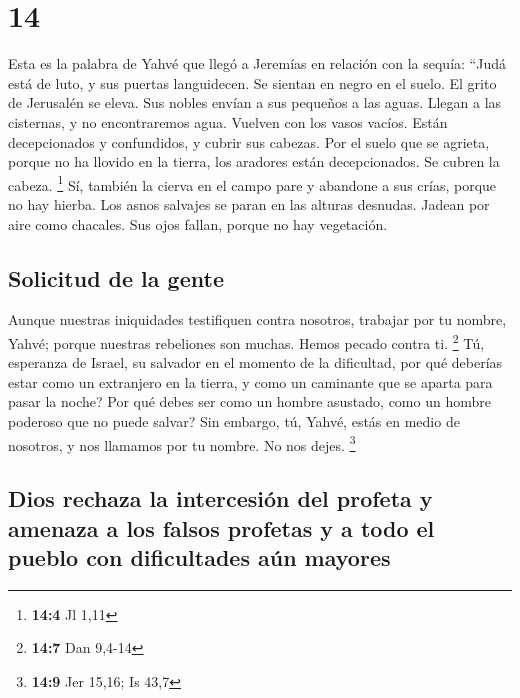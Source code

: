 \hypertarget{section-13}{%
\section{14}\label{section-13}}

 Esta es la palabra de Yahvé que llegó a Jeremías en
relación con la sequía:  ``Judá está de luto, y sus
puertas languidecen. Se sientan en negro en el suelo. El grito de
Jerusalén se eleva.  Sus nobles envían a sus pequeños a
las aguas. Llegan a las cisternas, y no encontraremos agua. Vuelven con
los vasos vacíos. Están decepcionados y confundidos, y cubrir sus
cabezas.  Por el suelo que se agrieta, porque no ha
llovido en la tierra, los aradores están decepcionados. Se cubren la
cabeza. \footnote{\textbf{14:4} Jl 1,11}  Sí, también la
cierva en el campo pare y abandone a sus crías, porque no hay hierba.
 Los asnos salvajes se paran en las alturas desnudas.
Jadean por aire como chacales. Sus ojos fallan, porque no hay
vegetación.

\hypertarget{solicitud-de-la-gente}{%
\subsection{Solicitud de la gente}\label{solicitud-de-la-gente}}

 Aunque nuestras iniquidades testifiquen contra nosotros,
trabajar por tu nombre, Yahvé; porque nuestras rebeliones son muchas.
Hemos pecado contra ti. \footnote{\textbf{14:7} Dan 9,4-14}
 Tú, esperanza de Israel, su salvador en el momento de la
dificultad, por qué deberías estar como un extranjero en la tierra, y
como un caminante que se aparta para pasar la noche?  Por
qué debes ser como un hombre asustado, como un hombre poderoso que no
puede salvar? Sin embargo, tú, Yahvé, estás en medio de nosotros, y nos
llamamos por tu nombre. No nos dejes. \footnote{\textbf{14:9} Jer 15,16;
  Is 43,7}

\hypertarget{dios-rechaza-la-intercesiuxf3n-del-profeta-y-amenaza-a-los-falsos-profetas-y-a-todo-el-pueblo-con-dificultades-auxfan-mayores}{%
\subsection{Dios rechaza la intercesión del profeta y amenaza a los
falsos profetas y a todo el pueblo con dificultades aún
mayores}\label{dios-rechaza-la-intercesiuxf3n-del-profeta-y-amenaza-a-los-falsos-profetas-y-a-todo-el-pueblo-con-dificultades-auxfan-mayores}}

